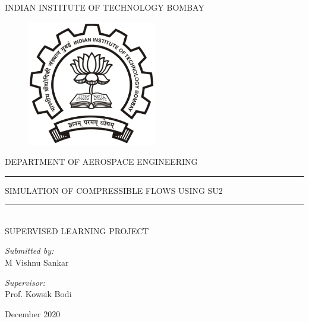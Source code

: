 \documentclass[12pt,a4paper]{article}
\begin{document}
\doublespacing

\begin{titlepage}
    \begin{center}
        {\large \sc INDIAN INSTITUTE OF TECHNOLOGY BOMBAY} \\
        \begin{figure}[H]
            \centering
            \includegraphics[width=0.5\textwidth]{text/IITB_logo.png}\\
        \end{figure}        
        
        {\small \sc DEPARTMENT OF AEROSPACE ENGINEERING}
        
        \vspace{1.5cm}
        \rule{\linewidth}{1pt}
        
        \vspace{0.7em} %
        {\Large \fseries SIMULATION OF COMPRESSIBLE FLOWS USING SU2}
        \vspace{0.2em} %
        
        \rule{\linewidth}{1pt} \\
        {\small \sc SUPERVISED LEARNING PROJECT}
    \end{center}
    
    \vspace{2.8cm}

       \begin{minipage}{0.43\textwidth}
        \emph{Submitted by:}\\
        M Vishnu Sankar
    \end{minipage}
    \hspace{4cm}
    \begin{minipage}{0.43\textwidth}
        \emph{Supervisor:}\\
        Prof. Kowsik Bodi
    \end{minipage}

    \vfill

    \begin{center}
        \makeatletter
         December 2020
        \makeatother
    \end{center}
\end{titlepage}
\end{document}
